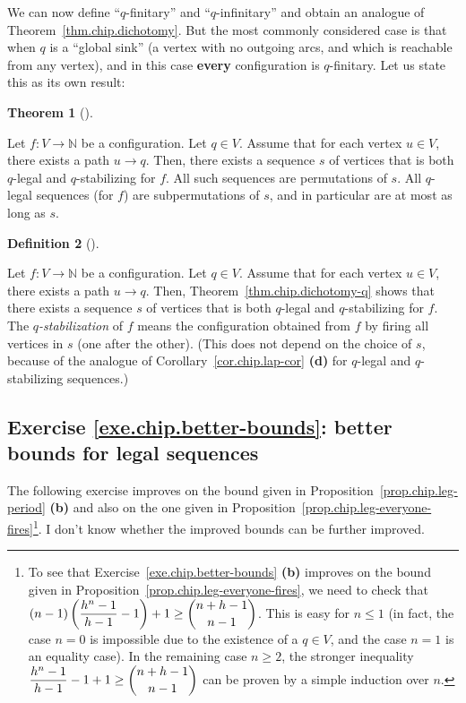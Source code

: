 \documentclass[numbers=enddot,12pt,final,onecolumn,notitlepage]{scrartcl}%
\newcounter{exer}
\theoremstyle{definition}
\newtheorem{theo}{Theorem}[section]
\newenvironment{theorem}[1][]
{\begin{theo}[#1]\begin{leftbar}}
{\end{leftbar}\end{theo}}
\newtheorem{defi}[theo]{Definition}
\newenvironment{definition}[1][]
{\begin{defi}[#1]\begin{leftbar}}
{\end{leftbar}\end{defi}}
\newcommand{\NN}{\mathbb{N}}
\newcommand{\tup}[1]{\left( #1 \right)}
\begin{document}
We can now define ``$q$-finitary'' and ``$q$-infinitary''
and obtain an analogue of Theorem~\ref{thm.chip.dichotomy}.
But the most commonly considered case is that when $q$ is
a ``global sink'' (a vertex with no outgoing arcs, and which
is reachable from any vertex),
and in this case \textbf{every} configuration is
$q$-finitary.
Let us state this as its own result:

\begin{theorem} \label{thm.chip.dichotomy-q}
Let $f : V \to \NN$ be a configuration.
Let $q \in V$.
Assume that for each vertex $u \in V$, there exists a path
$u \to q$.
Then, there exists a sequence $s$ of vertices that is both
$q$-legal and $q$-stabilizing for $f$.
All such sequences are permutations of $s$.
All $q$-legal sequences (for $f$) are subpermutations
of $s$, and in particular are at most as long as $s$.
\end{theorem}

\begin{definition}
Let $f : V \to \NN$ be a configuration.
Let $q \in V$.
Assume that for each vertex $u \in V$, there exists a path
$u \to q$.
Then, Theorem~\ref{thm.chip.dichotomy-q} shows that
there exists a sequence $s$ of vertices that is both
$q$-legal and $q$-stabilizing for $f$.
The \textit{$q$-stabilization} of $f$ means
the configuration obtained from $f$ by firing
all vertices in $s$ (one after the other).
(This does not depend on the choice of $s$, because of
the analogue of
Corollary~\ref{cor.chip.lap-cor} \textbf{(d)}
for $q$-legal and $q$-stabilizing sequences.)
\end{definition}


\subsection{Exercise \ref{exe.chip.better-bounds}: better
bounds for legal sequences}

The following exercise improves on the bound given in
Proposition~\ref{prop.chip.leg-period} \textbf{(b)} and
also on the one given in
Proposition~\ref{prop.chip.leg-everyone-fires}\footnote{To
  see that Exercise~\ref{exe.chip.better-bounds} \textbf{(b)}
  improves on the bound given in
  Proposition~\ref{prop.chip.leg-everyone-fires},
  we need to check that
  $\tup{n-1} \tup{ \dfrac{h^n-1}{h-1} - 1} + 1
  \geq \dbinom{n+h-1}{n-1}$.
  This is easy for $n \leq 1$ (in fact, the case
  $n = 0$ is impossible due to the existence of a
  $q \in V$, and the case $n = 1$ is an equality
  case).
  In the remaining case $n \geq 2$,
  the stronger inequality
  $\dfrac{h^n-1}{h-1} - 1 + 1
  \geq \dbinom{n+h-1}{n-1}$
  can be proven by a simple induction
  over $n$.}.
I don't know whether the improved bounds can be further
improved.
\end{document}
